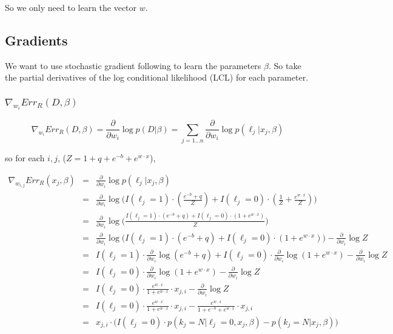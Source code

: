 \documentclass{article}
\begin{document}
So we only need to learn the vector $w$.

\subsection{Gradients}

We want to use stochastic gradient following to learn the parameters $\beta$. So take the partial derivatives of the log conditional likelihood (LCL) for each parameter.

\subsubsection{$ \nabla_{w_i}{Err_R (D, \beta)}$}

$$
\nabla_{w_i}{Err_R (D, \beta)} = \frac{\partial}{\partial w_i} \log{p(D|\beta)} =  \sum_{j=1...n}{\frac{\partial}{\partial w_i}\log{p(\ell_j | x_j, \beta)}}
$$

so for each $i,j$, ($Z = 1 + q + e^{-b} + e^{w \cdot x}$),


\begin{eqnarray*}
\nabla_{w_{i,j}}{Err_R (x_j, \beta)} &=& \frac{\partial}{\partial w_i}\log{p(\ell_j | x_j, \beta)} \\
 &=& \frac{\partial}{\partial w_i}
		\log{\Bigg(
			I(\ell_j=1) \cdot \left( \frac{e^{-b} + q}{Z} \right) + 
			I(\ell_j=0) \cdot \left(\frac{1}{Z} + \frac{e^{w \cdot x}}{Z} \right)
		\Bigg)} \\
 &=& \frac{\partial}{\partial w_i}
		\log{\Bigg(
		    \frac{
			I(\ell_j=1) \cdot \left( e^{-b} + q \right) + 
			I(\ell_j=0) \cdot \left(1 + e^{w \cdot x} \right)
		     }{Z}
		\Bigg)} \\
 &=& \frac{\partial}{\partial w_i}
		\log{\bigg(
			I(\ell_j=1) \cdot \left( e^{-b} + q \right) +
			I(\ell_j=0) \cdot \left( 1 + e^{w \cdot x} \right)
		\bigg)}
		- \frac{\partial}{\partial w_i}
		 \log{Z} \\
 &=& I(\ell_j=1) \cdot \frac{\partial}{\partial w_i}
		\log{(e^{-b} + q)} +
    I(\ell_j=0) \cdot \frac{\partial}{\partial w_i}
		\log{ \left( 1 + e^{w \cdot x} \right) }
		- \frac{\partial}{\partial w_i}
		 \log{Z} \\
 &=& I(\ell_j=0) \cdot \frac{\partial}{\partial w_i}
		\log{  \left( 1 + e^{w \cdot x} \right) }
		- \frac{\partial}{\partial w_i}
		 \log{Z} \\
 &=& I(\ell_j=0) \cdot 
 		\frac{
			e^{w \cdot x}
		}{
			1 + e^{w \cdot x}
		} \cdot x_{j,i}
		- \frac{\partial}{\partial w_i}
		 \log{Z} \\
 &=& I(\ell_j=0) \cdot 
 		\frac{
			e^{w \cdot x}
		}{
			1 + e^{w \cdot x}
		} \cdot x_{j,i}
		- \frac{e^{w \cdot x}}{
			1 + e^{-b} + e^{w \cdot x}
		} \cdot x_{j,i} \\
 &=& x_{j,i} \cdot
    \big(	I(\ell_j=0) \cdot p(k_j=N | \ell_j=0, x_j, \beta) - 
		p(k_j=N | x_j, \beta)
    \big) \\
\end{eqnarray*}
\end{document}
